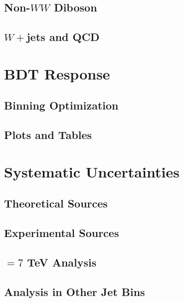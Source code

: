 \subsection{Non-$WW$ Diboson}

\subsection{$W+$jets and QCD}

\section{BDT Response}

\subsection{Binning Optimization}

\subsection{Plots and Tables}

\section{Systematic Uncertainties}

\subsection{Theoretical Sources}

\subsection{Experimental Sources}

\subsection{\sqrts$=7$ TeV Analysis}

\subsection{\hwwlnln Analysis in Other Jet Bins}





